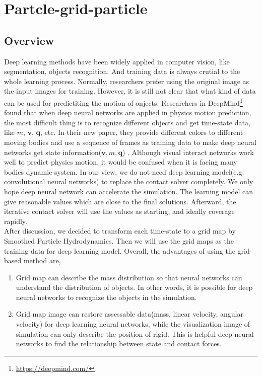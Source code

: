 \chapter{Partcle-grid-particle}
\section{Overview}
    Deep learning methods have been widely applied in computer vision, like segmentation, objects recognition. And training data is always crutial to the whole learning process. Normally, researchers prefer using the original image as the input images for training. However, it is still not clear that what kind of data can be used for predictiting the motion of onjects. Researchers in DeepMind\footnote{\url{https://deepmind.com/}} found that when deep neural networks are applied in physics motion prediction, the most difficult thing is to recognize different objects and get time-state data, like $m$, $\pmb{v}$, $\pmb{q}$, etc. In their new paper, they provide different colors to different moving bodies and use a sequence of frames as training data to make deep neural networks get state information($\pmb{v}, m, \pmb{q}$) \cite{DBLP:journals/corr/WattersTWPBZ17}.  Although visual interact networks work well to predict physics motion, it would be confused when it is facing many bodies dynamic system. In our view, we do not need deep learning model(e.g. convolutional neural networks) to replace the contact solver completely. We only hope deep neural network can accelerate the simulation. The learning model can give reasonable values which are close to the final solutions. Afterward, the iterative contact solver will use the values as starting, and ideally coverage rapidly. \\

    After discussion, we decided to transform each time-state to a grid map by Smoothed Particle Hydrodynamics. Then we will use the grid maps as the training data for deep learning model. Overall, the advantages of using the grid-based method are,
    \begin{enumerate}
        \item Grid map can describe the mass distribution so that neural networks can understand the distribution of objects. In other words, it is possible for deep neural networks to recognize the objects in the simulation.
        \item Grid map image can restore assessable data(mass, linear velocity, angular velocity) for deep learning neural networks, while the visualization image of simulation can only describe the position of rigid. This is helpful deep neural networks to find the relationship between state and contact forces.
    \end{enumerate}

